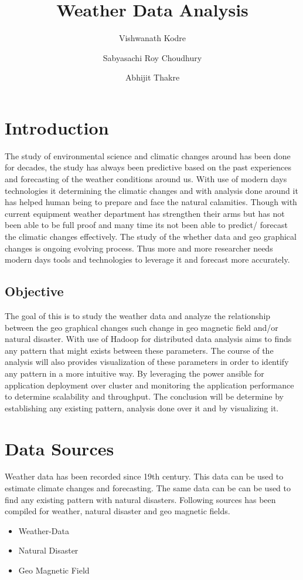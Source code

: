 \documentclass[9pt,twocolumn,twoside]{../../styles/osajnl}
\title{Weather Data Analysis}
\author[1]{Vishwanath Kodre}
\author[1]{Sabyasachi Roy Choudhury}
\author[1]{Abhijit Thakre}
\affil[1]{School of Informatics and Computing, Bloomington, IN 47408, U.S.A.}
\affil[1]{Corresponding authors: sabyasachi087@gmail.com, vkodre@gmail.com, athakre@gmail.com}
\begin{document}
\maketitle

\section{Introduction}

The study of environmental science and climatic changes around has been done for decades, the study
has always been predictive based on the past experiences and forecasting of the weather conditions
around us. With use of modern days technologies it determining the climatic changes and with analysis
done around it has helped human being to prepare and face the natural calamities. Though with current
equipment weather department has strengthen their arms but has not been able to be full proof and
many time its not been able to predict/ forecast the climatic changes effectively. The study of the
whether data and geo graphical changes is ongoing evolving process. Thus more and more researcher
needs modern days tools and technologies to leverage it and forecast more accurately.

\subsection{Objective}

The goal of this is to study the weather data and analyze the relationship between the geo graphical
changes such change in geo magnetic field and/or natural disaster. With use of Hadoop for distributed
data analysis aims to finds any pattern that might exists between these parameters. The course of the
analysis will also provides visualization of these parameters in order to identify any pattern in a more
intuitive way. By leveraging the power ansible for application deployment over cluster and monitoring
the application performance to determine scalability and throughput. The conclusion will be determine
by establishing any existing pattern, analysis done over it and by visualizing it.

\section{Data Sources}

Weather data has been recorded since 19th century. This data can be used to estimate climate changes
and forecasting. The same data can be can be used to find any existing pattern with natural disasters.
Following sources has been compiled for weather, natural disaster and geo magnetic fields.
\begin{itemize}
\item Weather-Data\cite{Weather-Data}
\item Natural Disaster\cite{Disaster-List-Data}
\item Geo Magnetic Field\cite{Geo-Magnetic-Data}
\end{itemize}
\end{document}
